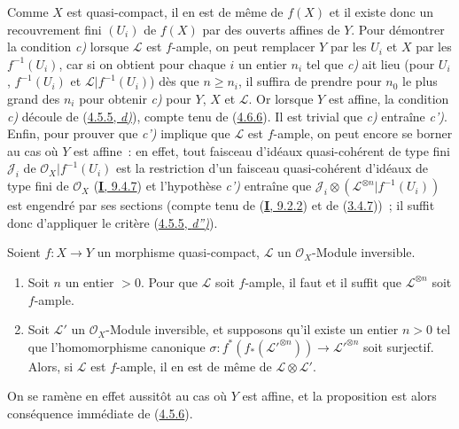 Comme $X$ est quasi-compact, il en est de même de $f(X)$ et il existe donc
un recouvrement fini $(U_i)$ de $f(X)$ par des ouverts affines de $Y$. Pour
démontrer la condition \emph{c)} lorsque $\mathcal{L}$ est $f$-ample, on peut
remplacer $Y$ par les $U_i$ et $X$ par les $f^{-1}(U_i)$, car si on obtient
pour chaque $i$ un entier $n_i$ tel que \emph{c)} ait lieu (pour $U_i$,
$f^{-1}(U_i)$ et $\mathcal{L}|f^{-1}(U_i)$) dès que $n\geq n_i$, il
suffira de prendre pour $n_0$ le plus grand des $n_i$ pour obtenir \emph{c)} pour
$Y$, $X$ et $\mathcal{L}$. Or lorsque $Y$ est affine, la condition \emph{c)}
découle de (\hyperref[II.4.5.5-fr]{4.5.5, \emph{d)}}), compte tenu de
(\hyperref[II.4.6.6-fr]{4.6.6}). Il est trivial que \emph{c)} entraîne \emph{c')}. Enfin,
pour prouver que \emph{c')} implique que $\mathcal{L}$ est $f$-ample, on peut
encore se borner au cas où $Y$ est affine~: en effet, tout faisceau
d'idéaux quasi-cohérent de type fini $\mathcal{J}_i$ de
$\mathcal{O}_X|f^{-1}(U_i)$ est la restriction d'un faisceau quasi-cohérent
d'idéaux de type fini de $\mathcal{O}_X$
(\hyperref[I.9.4.7-fr]{\textbf{I}, 9.4.7}) et l'hypothèse \emph{c')} entraîne que
$\mathcal{J}_i\otimes(\mathcal{L}^{\otimes n}|f^{-1}(U_i))$ est engendré
par ses sections (compte tenu de (\hyperref[I.9.2.2-fr]{\textbf{I}, 9.2.2}) et de
(\hyperref[II.3.4.7-fr]{3.4.7}))~; il suffit donc d'appliquer le critère
(\hyperref[II.4.5.5-fr]{4.5.5, \emph{d'')}}).

\begin{proposition}[4.6.9]
\label{II.4.6.9-fr}
Soient $f:X\to Y$ un morphisme quasi-compact, $\mathcal{L}$ un
$\mathcal{O}_X$-Module inversible.
\begin{enumerate}
  \item[\rm{(i)}] Soit $n$ un entier $>0$. Pour que $\mathcal{L}$ soit
  $f$-ample, il faut et il suffit que $\mathcal{L}^{\otimes n}$ soit
  $f$-ample.
  \item[\rm{(ii)}] Soit $\mathcal{L}'$ un $\mathcal{O}_X$-Module
  inversible, et supposons qu'il existe un entier $n>0$ tel que
  l'homomorphisme canonique
  $\sigma:f^*(f_*(\mathcal{L}'^{\otimes n}))\to
  \mathcal{L}'^{\otimes n}$ soit surjectif. Alors, si $\mathcal{L}$ est
  $f$-ample, il en est de même de $\mathcal{L}\otimes\mathcal{L}'$.
\end{enumerate}
\end{proposition}

On se ramène en effet aussitôt au cas où $Y$ est affine, et la proposition
est alors conséquence immédiate de (\hyperref[II.4.5.6-fr]{4.5.6}).

